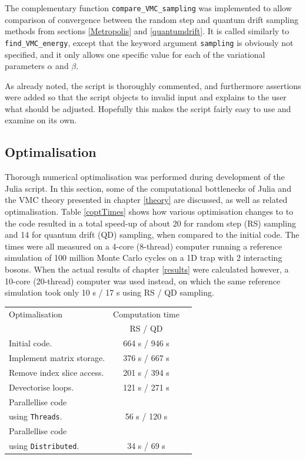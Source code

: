 \documentclass[a4paper,8pt]{article}
\begin{document}
\begin{multicols}{2}
The complementary function \texttt{compare\_VMC\_sampling} was implemented to allow comparison of convergence between the random step and quantum drift sampling methods from sections \ref{Metropolis} and \ref{quantumdrift}. It is called similarly to \texttt{find\_VMC\_energy}, except that the keyword argument \texttt{sampling} is obviously not specified, and it only allows one specific value for each of the variational parameters $\alpha$ and $\beta$.

As already noted, the script is thoroughly commented, and furthermore assertions were added so that the script objects to invalid input and explains to the user what should be adjusted. Hopefully this makes the script fairly easy to use and examine on its own.



\subsection{Optimalisation}\label{optimalisation}
Thorough numerical optimalisation was performed during development of the Julia script. In this section, some of the computational bottlenecks of Julia and the VMC theory presented in chapter \ref{theory} are discussed, as well as related optimalisation. Table \ref{coptTimes} shows how various optimisation changes to to the code resulted in a total speed-up of about 20 for random step (RS) sampling and 14 for quantum drift (QD) sampling, when compared to the initial code. The times were all measured on a 4-core (8-thread) computer running a reference simulation of 100 million Monte Carlo cycles on a 1D trap with 2 interacting bosons. When the actual results of chapter \ref{results} were calculated however, a 10-core (20-thread) computer was used instead, on which the same reference simulation took only 10 s / 17 s using RS / QD sampling.

\begin{center}\small
{}
\label{coptTimes}
\begin{tabular}{lcc}
	\hline\hline
	Optimalisation & Computation time \\
	 & RS / QD\\
	\hline
    Initial code. & 664 s / 946 s\\
    Implement matrix storage. & 376 s / 667 s\\
    Remove index slice access. & 201 s / 394 s\\
    Devectorise loops. & 121 s / 271 s\\
    Parallellise code & \\
    { using \texttt{Threads}.} & 56 s / 120 s\\
    Parallellise code & \\
    { using \texttt{Distributed}.} & 34 s / 69 s\\
    \hline\hline
\end{tabular}
\end{center}


\end{multicols}
\end{document}
